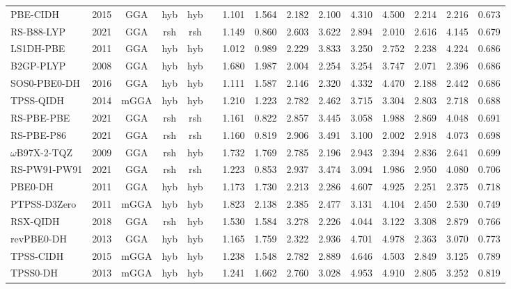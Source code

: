 \begin{landscape}
\begin{longtable}[c]{lc:cccc:rrrr:rr:rr:c}
PBE-CIDH         & 2015 & GGA  & hyb & hyb &     & 1.101 & 1.564 & 2.182  & 2.100  & 4.310  & 4.500  & 2.214  & 2.216  & 0.673 \\
RS-B88-LYP       & 2021 & GGA  & rsh & rsh &     & 1.149 & 0.860 & 2.603  & 3.622  & 2.894  & 2.010  & 2.616  & 4.145  & 0.679 \\
LS1DH-PBE        & 2011 & GGA  & hyb & hyb &     & 1.012 & 0.989 & 2.229  & 3.833  & 3.250  & 2.752  & 2.238  & 4.224  & 0.686 \\
B2GP-PLYP        & 2008 & GGA  & hyb & hyb &     & 1.680 & 1.987 & 2.004  & 2.254  & 3.254  & 3.747  & 2.071  & 2.396  & 0.686 \\
SOS0-PBE0-DH     & 2016 & GGA  & hyb & hyb &     & 1.111 & 1.587 & 2.146  & 2.320  & 4.332  & 4.470  & 2.188  & 2.442  & 0.686 \\
TPSS-QIDH        & 2014 & mGGA & hyb & hyb &     & 1.210 & 1.223 & 2.782  & 2.462  & 3.715  & 3.304  & 2.803  & 2.718  & 0.688 \\
RS-PBE-PBE       & 2021 & GGA  & rsh & rsh &     & 1.161 & 0.822 & 2.857  & 3.445  & 3.058  & 1.988  & 2.869  & 4.048  & 0.691 \\
RS-PBE-P86       & 2021 & GGA  & rsh & rsh &     & 1.160 & 0.819 & 2.906  & 3.491  & 3.100  & 2.002  & 2.918  & 4.073  & 0.698 \\
$\omega$B97X-2-TQZ      & 2009 & GGA  & rsh & hyb &     & 1.732 & 1.769 & 2.785  & 2.196  & 2.943  & 2.394  & 2.836  & 2.641  & 0.699 \\
RS-PW91-PW91     & 2021 & GGA  & rsh & rsh &     & 1.223 & 0.853 & 2.937  & 3.474  & 3.094  & 1.986  & 2.950  & 4.080  & 0.706 \\
PBE0-DH          & 2011 & GGA  & hyb & hyb &     & 1.173 & 1.730 & 2.213  & 2.286  & 4.607  & 4.925  & 2.251  & 2.375  & 0.718 \\
PTPSS-D3Zero     & 2011 & mGGA & hyb & hyb &     & 1.823 & 2.138 & 2.385  & 2.477  & 3.131  & 4.104  & 2.450  & 2.530  & 0.749 \\
RSX-QIDH         & 2018 & GGA  & rsh & hyb &     & 1.530 & 1.584 & 3.278  & 2.226  & 4.044  & 3.122  & 3.308  & 2.879  & 0.766 \\
revPBE0-DH       & 2013 & GGA  & hyb & hyb &     & 1.165 & 1.759 & 2.322  & 2.936  & 4.701  & 4.978  & 2.363  & 3.070  & 0.773 \\
TPSS-CIDH        & 2015 & mGGA & hyb & hyb &     & 1.238 & 1.548 & 2.782  & 2.889  & 4.646  & 4.503  & 2.849  & 3.125  & 0.789 \\
TPSS0-DH         & 2013 & mGGA & hyb & hyb &     & 1.241 & 1.662 & 2.760  & 3.028  & 4.953  & 4.910  & 2.805  & 3.252  & 0.819 \\

\end{longtable}
\end{landscape}
